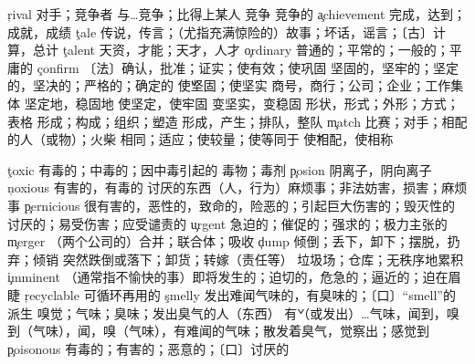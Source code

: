 \begin{multicols}{2}
\c{rival}  \n 对手；竞争者 \vt 与…竞争；比得上某人 \vi 竞争 \a 竞争的
\c{achievement}  \n 完成，达到；成就，成绩
\c{tale}  \n 传说，传言；（尤指充满惊险的）故事；坏话，谣言；〔古〕计算，总计
\c{talent}  \n 天资，才能；天才，人才
\c{ordinary}  \a 普通的；平常的；一般的；平庸的
\c{confirm}  \vt 〔法〕确认，批准；证实；使有效；使巩固
  \a 坚固的，坚牢的；坚定的，坚决的；严格的；确定的 \v 使坚固；使坚实 \n 商号，商行；公司；企业；工作集体 \ad 坚定地，稳固地 \vt 使坚定，使牢固 \vi 变坚实，变稳固 
  \n 形状，形式；外形；方式；表格 \vt 形成；构成；组织；塑造 \vi 形成，产生；排队，整队
\c{match}  \n 比赛；对手；相配的人（或物）；火柴 \vt 相同；适应；使较量；使等同于 \v 使相配，使相称

\c{toxic}  \a 有毒的；中毒的；因中毒引起的 \n 毒物；毒剂
\c{posion}  \n 阴离子，阴向离子
\c{noxious}  \a 有害的，有毒的
  \n 讨厌的东西（人，行为）麻烦事；非法妨害，损害；麻烦事
\c{pernicious}  \a 很有害的，恶性的，致命的，险恶的；引起巨大伤害的；毁灭性的
  \a 讨厌的；易受伤害；应受谴责的
\c{urgent}  \a 急迫的；催促的；强求的；极力主张的
\c{merger}  \n （两个公司的）合并；联合体；吸收
\c{dump}  \vt 倾倒；丢下，卸下；摆脱，扔弃；倾销 \vi 突然跌倒或落下；卸货；转嫁（责任等） \n 垃圾场；仓库；无秩序地累积
\c{imminent}  \a （通常指不愉快的事）即将发生的；迫切的，危急的；逼近的；迫在眉睫
\c{recyclable}  \a 可循环再用的
\c{smelly}  \a 发出难闻气味的，有臭味的；〔口〕“smell”的派生
  \n 嗅觉；气味；臭味；发出臭气的人（东西） \v 有（或发出）…气味，闻到，嗅到（气味），闻，嗅（气味），有难闻的气味；散发着臭气，觉察出；感觉到
\c{poisonous}  \a 有毒的；有害的；恶意的；〔口〕讨厌的


\end{multicols}
